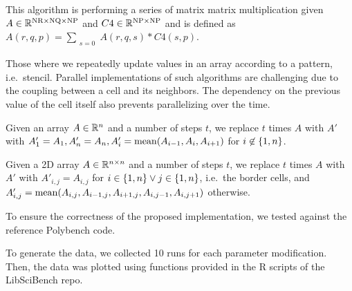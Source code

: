  This algorithm is performing a series of matrix matrix multiplication given $A\in\mathbb{R}^{{\rm NR}\times {\rm NQ} \times {\rm NP}}$ and $C4\in\mathbb{R}^{{\rm NP}\times {\rm NP}}$ and is defined as $A(r, q, p) = \sum_{\substack{s=0}} A(r, q, s)*C4(s, p)$.

 Those where we repeatedly update values in an array according to a pattern, i.e.~stencil.
Parallel implementations of such algorithms are challenging due to the coupling between a cell and its neighbors.
The dependency on the previous value of the cell itself also prevents parallelizing over the time.

 Given an array $A\in\mathbb{R}^n$ and a number of steps $t$, we replace $t$ times $A$ with $A'$ with $A'_1=A_1, A'_n=A_n, A'_i=\operatorname{mean}\!{\left( A_{i-1},A_{i},A_{i+1} \right)}$ for $i\not\in{\left\{ 1,n \right\}}$.

 Given a 2D array $A\in\mathbb{R}^{n\times n}$ and a number of steps $t$, we replace $t$ times $A$ with $A'$ with $A'_{i,j}=A_{i,j}$ for $i\in{\left\{ 1,n \right\}}\lor j\in{\left\{ 1,n \right\}}$, i.e.~the border cells, and
$A'_{i,j}=\operatorname{mean}\!{\left( A_{i,j},A_{i-1,j},A_{i+1,j},A_{i,j-1},A_{i,j+1} \right)}$ otherwise.

 To ensure the correctness of the proposed implementation, we tested against the reference Polybench code.

 To generate the data, we collected 10 runs for each parameter modification. Then, the data was plotted using functions provided in the R scripts of the LibSciBench \cite{libscibench} repo.